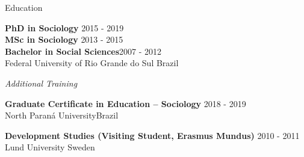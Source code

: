 \begin{rSection}{Education}

{\bf PhD in Sociology} \hfill {2015 - 2019} \\
{\bf MSc in Sociology} \hfill {2013 - 2015} \\
{\bf Bachelor in Social Sciences}\hfill {2007 - 2012}\\
{Federal University of Rio Grande do Sul} \hfill { Brazil}

\par
\emph{Additional Training}
\par

{\textbf{Graduate Certificate in Education – Sociology }}{\hfill  2018 - 2019}\\ 
{North Paraná University}\hfill{Brazil}\par
{\bf Development Studies (Visiting Student, Erasmus Mundus)} \hfill 
{2010 - 2011} \\
{Lund University} \hfill {Sweden} 

\end{rSection}